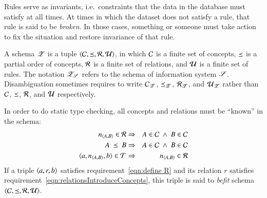 \documentclass{elsarticle}
\begin{document}

   Rules serve as invariants,
   i.e.\ constraints that the data in the database must satisfy at all times.
   At times in which the dataset does not satisfy a rule, that rule is said to be {\em broken}.
   In those cases, something or someone must take action to fix the situation and restore invariance of that rule.

   A schema $\mathscr{Z}$ is a tuple $\langle{\mathcal{C}},{\preceq},{\mathcal{R}},{\mathcal{U}}\rangle$,
   in which $\mathcal{C}$ is a finite set of concepts,
   $\preceq$ is a partial order of concepts,
   $\mathcal{R}$ is a finite set of relations,
   and $\mathcal{U}$ is a finite set of rules.
   The notation $\mathscr{Z}_{\mathscr{S}}$ refers to the schema of information system $\mathscr{S}$.
   Disambiguation sometimes requires to write $\mathcal{C}_{\mathscr{Z}}$, $\preceq_{\mathscr{Z}}$, $\mathcal{R}_{\mathscr{Z}}$, and $\mathcal{U}_{\mathscr{Z}}$
   rather than $\mathcal{C}$, $\preceq$, $\mathcal{R}$, and $\mathcal{U}$ respectively.

   In order to do static type checking,
   all concepts and relations must be ``known'' in the schema:
\begin{eqnarray}
   \declare{n}{A}{B}\in\rels&\Rightarrow&A\in\concepts\ \wedge\ B\in\concepts
   \label{eqn:relationsIntroduceConcepts}\\
   A\ \isa\ B&\Rightarrow&A\in\concepts\ \wedge\ B\in\concepts
   \label{eqn:isasIntroduceConcepts}\\
   \triple{a}{\declare{n}{A}{B}}{b}\in\triples&\Rightarrow&\declare{n}{A}{B}\in\rels
   \label{eqn:define R}
\end{eqnarray}
   If a triple $\langle{a},{r},{b}\rangle$ satisfies requirement~\ref{eqn:define R} and its relation $r$ satisfies requirement~\ref{eqn:relationsIntroduceConcepts},
   this triple is said to {\em befit} schema $\langle{\mathcal{C}},{\preceq},{\mathcal{R}},{\mathcal{U}}\rangle$.
\end{document}
